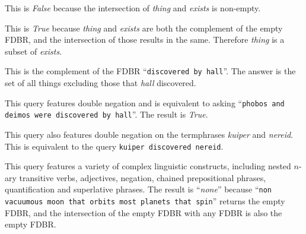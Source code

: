 \documentclass[../main.tex]{subfiles}
\begin{document}
\begin{refsection}
\examplespacing


\examplespacing

\noindent This is \textit{False} because the intersection of \textit{thing} and \textit{exists} is non-empty.

\examplespacing


\examplespacing

\noindent This is \textit{True} because \textit{thing} and \textit{exists} are both the complement of the empty FDBR, and the intersection of those results in the same.  Therefore \textit{thing} is a subset of \textit{exists}.

\examplespacing


\examplespacing

\noindent This is the complement of the FDBR ``\texttt{discovered by hall}''.  The answer is the set of all things excluding those that \textit{hall} discovered.

\examplespacing


\examplespacing

\noindent This query features double negation and is equivalent to asking ``\texttt{phobos and deimos were discovered by hall}''.  The result is \textit{True}.

\examplespacing


\examplespacing

\noindent This query also features double negation on the termphrases \textit{kuiper} and \textit{nereid}.
This is equivalent to the query \texttt{kuiper discovered nereid}.

\examplespacing


\examplespacing

\noindent This query features a variety of complex linguistic constructs, including nested $n$-ary transitive verbs, adjectives, negation, chained prepositional phrases, quantification and superlative phrases.  The result is ``\textit{none}'' because ``\texttt{non vacuumous moon that orbits most planets that spin}'' returns the empty FDBR, and the intersection of the empty FDBR with any FDBR is also the empty FDBR.


\end{refsection}
\end{document}
